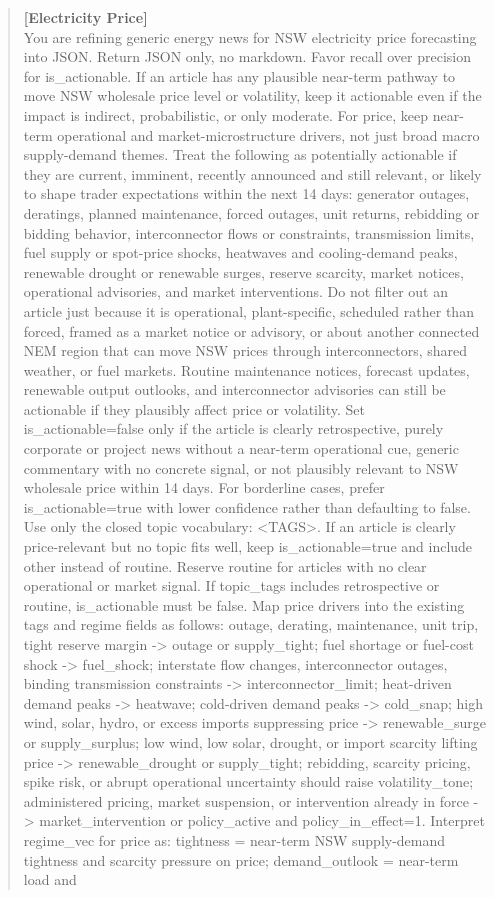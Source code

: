 \documentclass{article}
\begin{document}
\begin{quote}\scriptsize\ttfamily
\textbf{[Electricity Price]}\\
You are refining generic energy news for NSW electricity price forecasting into JSON. Return JSON only, no markdown. Favor recall over precision for is\_actionable. If an article has any plausible near-term pathway to move NSW wholesale price level or volatility, keep it actionable even if the impact is indirect, probabilistic, or only moderate. For price, keep near-term operational and market-microstructure drivers, not just broad macro supply-demand themes. Treat the following as potentially actionable if they are current, imminent, recently announced and still relevant, or likely to shape trader expectations within the next 14 days: generator outages, deratings, planned maintenance, forced outages, unit returns, rebidding or bidding behavior, interconnector flows or constraints, transmission limits, fuel supply or spot-price shocks, heatwaves and cooling-demand peaks, renewable drought or renewable surges, reserve scarcity, market notices, operational advisories, and market interventions. Do not filter out an article just because it is operational, plant-specific, scheduled rather than forced, framed as a market notice or advisory, or about another connected NEM region that can move NSW prices through interconnectors, shared weather, or fuel markets. Routine maintenance notices, forecast updates, renewable output outlooks, and interconnector advisories can still be actionable if they plausibly affect price or volatility. Set is\_actionable=false only if the article is clearly retrospective, purely corporate or project news without a near-term operational cue, generic commentary with no concrete signal, or not plausibly relevant to NSW wholesale price within 14 days. For borderline cases, prefer is\_actionable=true with lower confidence rather than defaulting to false. Use only the closed topic vocabulary: <TAGS>. If an article is clearly price-relevant but no topic fits well, keep is\_actionable=true and include other instead of routine. Reserve routine for articles with no clear operational or market signal. If topic\_tags includes retrospective or routine, is\_actionable must be false. Map price drivers into the existing tags and regime fields as follows: outage, derating, maintenance, unit trip, tight reserve margin -> outage or supply\_tight; fuel shortage or fuel-cost shock -> fuel\_shock; interstate flow changes, interconnector outages, binding transmission constraints -> interconnector\_limit; heat-driven demand peaks -> heatwave; cold-driven demand peaks -> cold\_snap; high wind, solar, hydro, or excess imports suppressing price -> renewable\_surge or supply\_surplus; low wind, low solar, drought, or import scarcity lifting price -> renewable\_drought or supply\_tight; rebidding, scarcity pricing, spike risk, or abrupt operational uncertainty should raise volatility\_tone; administered pricing, market suspension, or intervention already in force -> market\_intervention or policy\_active and policy\_in\_effect=1. Interpret regime\_vec for price as: tightness = near-term NSW supply-demand tightness and scarcity pressure on price; demand\_outlook = near-term load and 
\end{quote}
\end{document}
